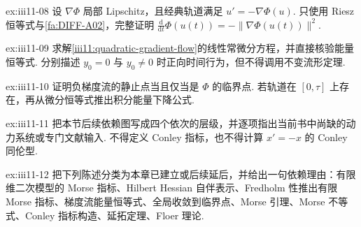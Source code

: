 \begin{FAExercise}[梯度流能量恒等式]{ex:iii11-08}
设 \(\displaystyle\nabla\Phi\) 局部 Lipschitz，且经典轨道满足 \(\displaystyle u'=-\nabla\Phi(u)\). 只使用 Riesz 恒等式与\autoref{fa:DIFF-A02}，完整证明 \(\displaystyle\frac{\mathrm{d}}{\mathrm{d}t}\Phi(u(t))=-\|\nabla\Phi(u(t))\|^2\).
\end{FAExercise}

\begin{FAExercise}[二次梯度流]{ex:iii11-09}
求解\autoref{iii11:quadratic-gradient-flow}的线性常微分方程，并直接核验能量恒等式. 分别描述 \(\displaystyle y_0=0\) 与 \(\displaystyle y_0\neq0\) 时正向时间行为，但不得调用不变流形定理.
\end{FAExercise}

\begin{FAExercise}[临界点与平衡点]{ex:iii11-10}
证明负梯度流的静止点当且仅当是 \(\displaystyle\Phi\) 的临界点. 若轨道在 \(\displaystyle[0,\tau]\) 上存在，再从微分恒等式推出积分能量下降公式.
\end{FAExercise}

\begin{FAExercise}{ex:iii11-11}
把本节后续依赖图写成四个依次的层级，并逐项指出当前书中尚缺的动力系统或专门文献输入. 不得定义 Conley 指标，也不得计算 \(\displaystyle x'=-x\) 的 Conley 同伦型.
\end{FAExercise}

\begin{FAExercise}[已建立结果与延后结果分类]{ex:iii11-12}
把下列陈述分类为本章已建立或后续延后，并给出一句依赖理由：有限维二次模型的 Morse 指标、Hilbert Hessian 自伴表示、Fredholm 性推出有限 Morse 指标、梯度流能量恒等式、全局收敛到临界点、Morse 引理、Morse 不等式、Conley 指标构造、延拓定理、Floer 理论.
\end{FAExercise}
